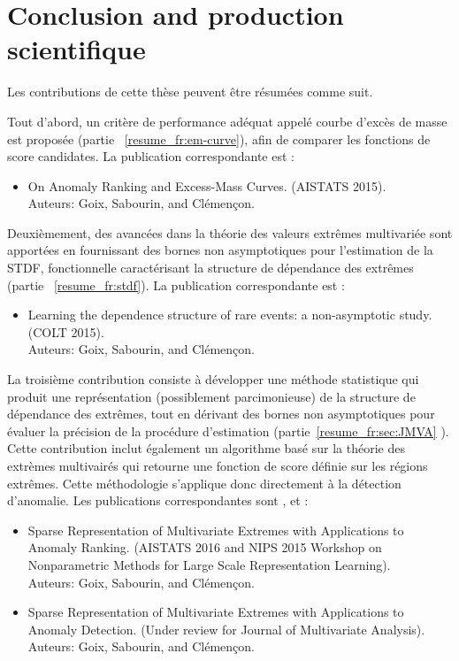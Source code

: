 \documentclass[a4paper, 12pt]{article}
\begin{document}
\section{Conclusion and production scientifique}
\label{resume_fr:intro:concl}
Les contributions de cette thèse peuvent être résumées comme suit.

Tout d'abord, un critère de performance adéquat appelé courbe d'excès de masse est proposée (partie ~\ref{resume_fr:em-curve}), afin de comparer les fonctions de score candidates.
La publication correspondante est \cite{AISTAT15}:
%
\begin{itemize}
\item On Anomaly Ranking and Excess-Mass Curves. (AISTATS 2015).\\
Auteurs: Goix, Sabourin, and Clémençon. 
\end{itemize}


Deuxièmement, des avancées dans la théorie des valeurs extrêmes multivariée sont apportées en fournissant des bornes non asymptotiques pour l'estimation de la STDF, fonctionnelle caractérisant la structure de dépendance des extrêmes (partie ~\ref{resume_fr:stdf}). La publication correspondante est \cite{COLT15}:
%
\begin{itemize}
\item Learning the dependence structure of rare events: a non-asymptotic study. (COLT 2015).\\
Auteurs: Goix, Sabourin, and Clémençon.
\end{itemize}

La troisième contribution consiste à développer une méthode statistique qui produit une représentation (possiblement parcimonieuse) de la structure de dépendance des extrêmes, tout en dérivant des bornes non asymptotiques pour évaluer la précision de la procédure d'estimation (partie~\ref{resume_fr:sec:JMVA} ).
Cette contribution inclut également un algorithme basé sur la théorie des extrèmes multivairés qui retourne une fonction de score définie sur les régions extrêmes. Cette méthodologie s'applique donc directement à la détection d'anomalie.
%
Les publications correspondantes sont \cite{AISTAT16}, \cite{NIPSWORKSHOP15} et \cite{ARXIV16}:
%
\begin{itemize}
\item Sparse Representation of Multivariate Extremes with Applications to Anomaly Ranking. (AISTATS 2016 and NIPS 2015 Workshop on Nonparametric Methods for Large Scale Representation Learning).\\
Auteurs: Goix, Sabourin, and Clémençon.
\item Sparse Representation of Multivariate Extremes with Applications to Anomaly Detection. (Under review for Journal of Multivariate Analysis).\\
Auteurs: Goix, Sabourin, and Clémençon.
\end{itemize}
\end{document}
